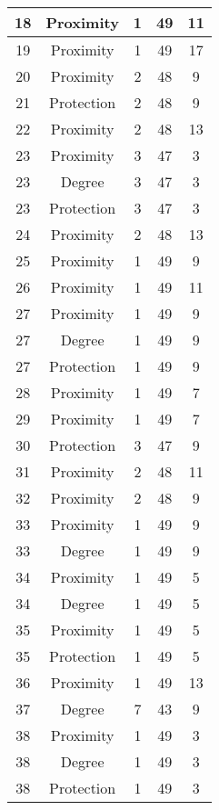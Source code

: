 \documentclass[results.tex]{subfiles}
\begin{document}
\begin{center}
\begin{tabular}{| c || c | c | c | c |}
    \hline
    18 & Proximity & 1 & 49 & 11 \\ 
    \hline
    19 & Proximity & 1 & 49 & 17 \\ 
    \hline
    20 & Proximity & 2 & 48 & 9 \\ 
    \hline
    21 & Protection & 2 & 48 & 9 \\ 
    \hline
    22 & Proximity & 2 & 48 & 13 \\ 
    \hline
    23 & Proximity & 3 & 47 & 3 \\ 
    \hline
    23 & Degree & 3 & 47 & 3 \\ 
    \hline
    23 & Protection & 3 & 47 & 3 \\ 
    \hline
    24 & Proximity & 2 & 48 & 13 \\ 
    \hline
    25 & Proximity & 1 & 49 & 9 \\ 
    \hline
    26 & Proximity & 1 & 49 & 11 \\ 
    \hline
    27 & Proximity & 1 & 49 & 9 \\ 
    \hline
    27 & Degree & 1 & 49 & 9 \\ 
    \hline
    27 & Protection & 1 & 49 & 9 \\ 
    \hline
    28 & Proximity & 1 & 49 & 7 \\ 
    \hline
    29 & Proximity & 1 & 49 & 7 \\ 
    \hline
    30 & Protection & 3 & 47 & 9 \\ 
    \hline
    31 & Proximity & 2 & 48 & 11 \\ 
    \hline
    32 & Proximity & 2 & 48 & 9 \\ 
    \hline
    33 & Proximity & 1 & 49 & 9 \\ 
    \hline
    33 & Degree & 1 & 49 & 9 \\ 
    \hline
    34 & Proximity & 1 & 49 & 5 \\ 
    \hline
    34 & Degree & 1 & 49 & 5 \\ 
    \hline
    35 & Proximity & 1 & 49 & 5 \\ 
    \hline
    35 & Protection & 1 & 49 & 5 \\ 
    \hline
    36 & Proximity & 1 & 49 & 13 \\ 
    \hline
    37 & Degree & 7 & 43 & 9 \\ 
    \hline
    38 & Proximity & 1 & 49 & 3 \\ 
    \hline
    38 & Degree & 1 & 49 & 3 \\ 
    \hline
    38 & Protection & 1 & 49 & 3 \\ 

\end{tabular}
\end{center}
\end{document}
